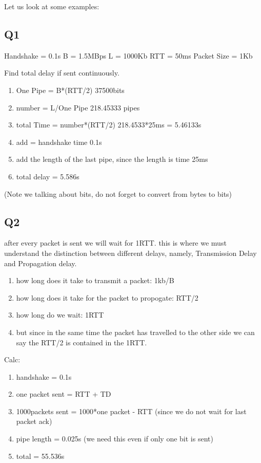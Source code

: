 \documentclass[12pt]{book}
\begin{document}
Let us look at some examples:
\subsection{Q1}
Handshake = 0.1s
B = 1.5MBps
L = 1000Kb
RTT = 50ms
Packet Size = 1Kb

Find total delay if sent continuously.
\begin{enumerate}
    \item One Pipe    = B*(RTT/2) 37500bits
    \item number      = L/One Pipe 218.45333 pipes
    \item total Time  = number*(RTT/2) 218.4533*25ms = 5.46133s
    \item add         = handshake time 0.1s
    \item add the length of the last pipe, since the length is time 25ms
    \item total delay = 5.586s
\end{enumerate}
(Note we talking about bits, do not forget to convert from bytes to bits)
\subsection{Q2}
after every packet is sent we will wait for 1RTT.
this is where we must understand the distinction between different delays, namely, Transmission Delay and Propagation delay.
\begin{enumerate}
    \item how long does it take to transmit a packet: 1kb/B
    \item how long does it take for the packet to propogate: RTT/2
    \item how long do we wait: 1RTT
    \item but since in the same time the packet has travelled to the other side we can say the RTT/2 is contained in the 1RTT.
\end{enumerate}
Calc:
\begin{enumerate}
    \item handshake = 0.1s
    \item one packet sent = RTT + TD
    \item 1000packets sent = 1000*one packet - RTT (since we do not wait for last packet ack)
    \item pipe length = 0.025s (we need this even if only one bit is sent)
    \item total = 55.536s
\end{enumerate}
\end{document}
